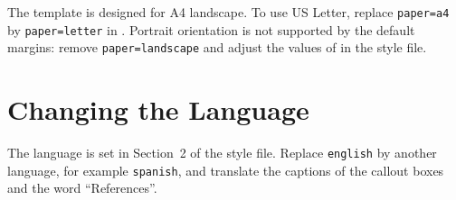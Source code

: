 The template is designed for A4 landscape. To use US Letter, replace
\texttt{paper=a4} by \texttt{paper=letter} in . Portrait
orientation is not supported by the default margins: remove
\texttt{paper=landscape} and adjust the values of  in the style
file.

\section{Changing the Language}

The language is set in Section~2 of the style file. Replace \texttt{english}
by another  language, for example \texttt{spanish}, and translate
the captions of the callout boxes and the word \enquote{References}.
